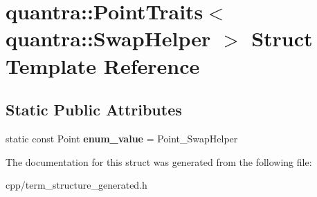 \hypertarget{structquantra_1_1PointTraits_3_01quantra_1_1SwapHelper_01_4}{}\section{quantra\+:\+:Point\+Traits$<$ quantra\+:\+:Swap\+Helper $>$ Struct Template Reference}
\label{structquantra_1_1PointTraits_3_01quantra_1_1SwapHelper_01_4}
\subsection*{Static Public Attributes}
\begin{DoxyCompactItemize}
\item 
\mbox{\label{structquantra_1_1PointTraits_3_01quantra_1_1SwapHelper_01_4_a86a19b5b6af8ab87bf2a4f8118ea4190}} 
static const Point {\bfseries enum\+\_\+value} = Point\+\_\+\+Swap\+Helper
\end{DoxyCompactItemize}


The documentation for this struct was generated from the following file\+:\begin{DoxyCompactItemize}
\item 
cpp/term\+\_\+structure\+\_\+generated.\+h\end{DoxyCompactItemize}

